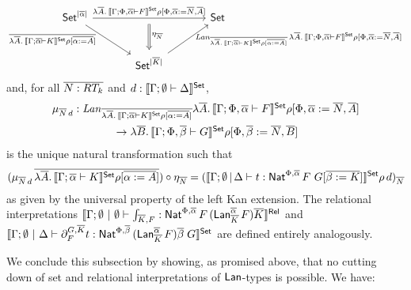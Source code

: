 \documentclass{lmcs}
\theoremstyle{plain}\newtheorem{satz}[thm]{Satz}
\newcommand{\set}{\mathsf{Set}}
\begin{document}
{\vspace*{-0.1in}

\[\begin{tikzcd} [column sep = large, row sep = large]
\set^{|\ol \alpha|}
\ar[rr, "\lambda \ol{A}.\,\setsem{\Gamma; \Phi, \ol\alpha
    \vdash F}\rho {[\Phi, \ol \alpha := \ol{N}, \ol{A} ]}"{name=F}] 
\ar[dr, "\ol{\lambda \ol{A}.\,\setsem{\Gamma; \ol\alpha \vdash
      K}\rho {[\ol{\alpha := A} ]}}\;\;\;\;"{left}] && \set \\  
&\set^{|\ol K|} \ar[ur, "\;\;\mathit{Lan}_{\ol{\lambda \ol A.\,
      \setsem{\Gamma; \ol\alpha \vdash K}\rho {[\ol{\alpha := A}
  ]}}}\, \lambda \ol A.\, \setsem{\Gamma; \Phi, \ol\alpha \vdash
    F}\rho {[\Phi, \ol \alpha :=  \ol N, \ol A ]}"{right}]
\ar[d, Rightarrow, shorten <= 2mm, shorten >= 1mm, 
          from=F, to=2-2,  "\eta_{\ol{N}}"{}]
\end{tikzcd}\]
and, for all $\overline{N : RT_k}$ and $d : \setsem{\Gamma;\emptyset \vdash
  \Delta}$,
\[\begin{array}{l}
\mu_{\ol{N}\, d} : 
\mathit{Lan}_{\ol{\lambda \ol A.\,\setsem{\Gamma; \ol\alpha \vdash K}\rho 
  {[\ol{\alpha := A} ]}}} \lambda \ol A.\,\setsem{\Gamma; \Phi,
  \ol\alpha \vdash F}\rho {[\Phi, \ol \alpha := \ol N, \ol A ]}\\[2ex]
\hspace*{0.8in} \to \lambda \ol B.\, \setsem{\Gamma; 
  \Phi, \ol\beta \vdash G} \rho[\Phi, \ol \beta := \ol N, \ol B]
\end{array}\]
is the unique natural transformation such that
\begin{equation}\label{eq:defn-of-mu-sub-N}
(\mu_{\ol{N}\, d} \, \ol{\lambda \ol A.\,\setsem{\Gamma; \ol\alpha \vdash K}
  \rho[\ol{\alpha := A}]}) \circ \eta_{\ol{N}}
= (\setsem{\Gamma; \emptyset \,|\, \Delta \vdash t : \Nat^{\Phi,
  \ol\alpha} \, F \,\, G[\ol{\beta := K}]}\rho \, d)_{\ol{N}}
\end{equation}
as given by the universal property of the left Kan extension.  The
relational interpretations $\llbracket{\Gamma;\emptyset~|~\emptyset
  \vdash \int_{\overline{K},F} : \mathsf{Nat}^{\Phi, \overline{\alpha}}\, F\,
  (\mathsf{Lan}^{\overline{\alpha}}_{\overline{K}}\, F) \overline{K}}\rrbracket^{\mathsf{Rel}}$ and
$\setsem{\Gamma;\emptyset~|~\Delta \vdash \partial^{G, \ol K}_F t :
  \Nat^{\Phi, \ol\beta}\, (\Lan^{\ol\alpha}_{\ol K}\,F) \ol \beta\;
  G}$ are defined entirely analogously.

\vspace*{0.05in}

We conclude this subsection by showing, as promised above, that no
cutting down of set and relational interpretations of $\mathsf{Lan}$-types is
possible. We have:

}
\end{document}
